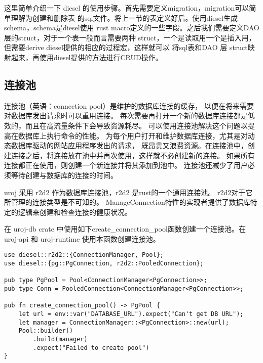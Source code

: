 这里简单介绍一下 diesel 的使用步骤。首先需要定义migration，migration可以简单理解为创建和删除表
的sql文件。将上一节的表定义好后。使用diesel生成schema，schema是diesel使用
rust macro定义的一些字段。之后我们需要定义DAO层的struct，对于一个表一般而言需要两种
struct，一个是读取用一个是插入用，但需要derive diesel提供的相应的过程宏，这样就可以
将sql表和DAO 层 struct映射起来，再使用diesel提供的方法进行CRUD操作。

\subsection{连接池}
连接池（英语：connection pool）是维护的数据库连接的缓存，
以便在将来需要对数据库发出请求时可以重用连接。
每次需要再打开一个新的数据库连接都是低效的，而且在高流量条件下会导致资源耗尽。
可以使用连接池解决这个问题以提高在数据库上执行命令的性能。
为每个用户打开和维护数据库连接，尤其是对动态数据库驱动的网站应用程序发出的请求，
既昂贵又浪费资源。在连接池中，创建连接之后，将连接放在池中并再次使用，这样就不必创建新的连接。
如果所有连接都正在使用，则创建一个新连接并将其添加到池中。
连接池还减少了用户必须等待创建与数据库的连接的时间。

uroj 采用 r2d2 作为数据库连接池，r2d2 是rust的一个通用连接池。
r2d2对于它所管理的连接类型是不可知的。
ManageConnection特性的实现者提供了数据库特定的逻辑来创建和检查连接的健康状况。

在 uroj-db crate 中使用如下create\_connection\_pool函数创建一个连接池。在
uroj-api 和 uroj-runtime 使用本函数创建连接池。
\begin{lstlisting}
use diesel::r2d2::{ConnectionManager, Pool};
use diesel::{pg::PgConnection, r2d2::PooledConnection};

pub type PgPool = Pool<ConnectionManager<PgConnection>>;
pub type Conn = PooledConnection<ConnectionManager<PgConnection>>;

pub fn create_connection_pool() -> PgPool {
    let url = env::var("DATABASE_URL").expect("Can't get DB URL");
    let manager = ConnectionManager::<PgConnection>::new(url);
    Pool::builder()
        .build(manager)
        .expect("Failed to create pool")
}
\end{lstlisting}